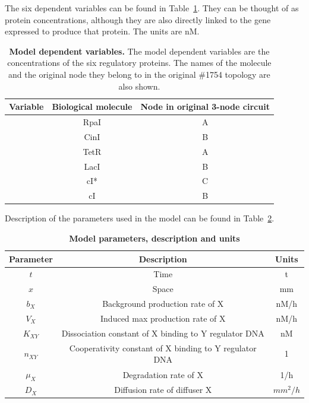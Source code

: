 The six dependent variables can be found in Table~\ref{tab:Model variables}.
They can be thought of as protein concentrations, although they are also directly linked to the gene expressed to produce that protein.
The units are nM.
\begin{table}[H]
    \centering
    \caption{\textbf{Model dependent variables.} The model dependent variables are the concentrations of the six regulatory proteins. The names of the molecule and the original node they belong to in the original \#1754 topology are also shown.}
    \label{tab:Model variables}
    \renewcommand{\arraystretch}{1.3} %
    \begin{tabular}{|c|c|c|}
        \hline
        \textbf{Variable} & \textbf{Biological molecule} & \textbf{Node in original 3-node circuit}\\
        \hline
        [A] & RpaI & A\\
        \hline
        [B] & CinI & B \\
        \hline
        [C] & TetR & A\\
        \hline
        [D] & LacI & B \\
        \hline
        [E] & cI* & C \\
        \hline
        [F] & cI & B \\
        \hline
    \end{tabular}
\end{table}
Description of the parameters used in the model can be found in Table~\ref{tab:model params}.

\begin{table}[H]
    \centering
    \caption{\textbf{Model parameters, description and units}}
    \label{tab:model params}
    \renewcommand{\arraystretch}{1.3} %
    \begin{tabular}{|c|c|c|}
        \hline
        \textbf{Parameter} & \textbf{Description} & \textbf{Units}\\
        \hline
        $t$ & Time & t\\
        \hline
        $x$ & Space & mm\\
        \hline
        $b_{X}$ & Background production rate of X & nM/h\\
        \hline
        $V_{X}$ & Induced max production rate of X & nM/h \\
        \hline
        $K_{XY}$ & Dissociation constant of X binding to Y regulator DNA & nM \\
        \hline
        $n_{XY}$ & Cooperativity constant of X binding to Y regulator DNA & 1\\
        \hline
        $\mu_{X}$ & Degradation rate of X & 1/h\\
        \hline
        $D_{X}$ & Diffusion rate of diffuser X & $mm^2/h$\\
        \hline

    \end{tabular}
\end{table}



